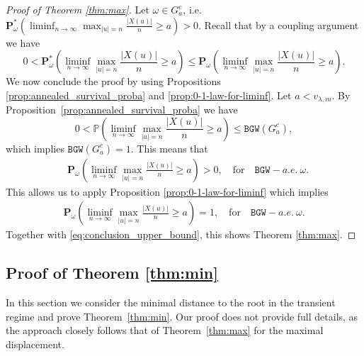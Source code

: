 \documentclass[11 pt]{article}
\theoremstyle{definition}
\numberwithin{equation}{section}
\newcommand{\PP}{\mathbb{P}} %
\newcommand{\Pw}{\mathbf{P}_{\omega}} %
\begin{document}
\begin{proof}[Proof of Theorem \ref{thm:max}]
	Let $\omega \in G_a^c$, i.e.\ $\mathbf{P}_{\omega}^* ( \liminf_{n \to \infty} \max_{|u|=n} \frac{\vert X(u) \vert }{n} \geq a )>0$. Recall that by a coupling argument we have
	  $$0<\mathbf{P}_{\omega}^* ( \liminf_{n \to \infty} \max_{|u|=n} \frac{\vert X(u) \vert }{n} \geq a )\le \mathbf{P}_{\omega} ( \liminf_{n \to \infty} \max_{|u|=n} \frac{\vert X(u) \vert }{n} \geq a ).$$
	We now conclude the proof by using Propositions \ref{prop:annealed_survival_proba} and \ref{prop:0-1-law-for-liminf}. Let $a<v_{\lambda,m}$. By Proposition~\ref{prop:annealed_survival_proba} we have 
	\begin{equation*}
		0<\PP \left( \liminf_{n\to\infty} \max_{\vert u \vert = n} \frac{\vert X(u) \vert}{n} \ge  a\right) \le \mathtt{BGW}(G_a^c),
	\end{equation*}
	which implies $\mathtt{BGW}(G_{a}^c) =1$. This means that 
	\begin{align*}
		&\Pw\left( \liminf_{n\to\infty} \max_{\vert u \vert = n} \frac{\vert X(u) \vert}{n} \geq a\right) > 0 , \quad \text{for} \quad \mathtt{BGW}-a.e. \ \omega .
	\end{align*}
	This allows us to apply Proposition \ref{prop:0-1-law-for-liminf} which implies
	\begin{align*} \Pw\left( \liminf_{n\to\infty} \max_{\vert u \vert = n} \frac{\vert X(u) \vert}{n} \geq a\right) =1, \quad \text{for} \quad \mathtt{BGW}-a.e. \ \omega.
	\end{align*}
	Together with \eqref{eq:conclusion_upper_bound}, this shows Theorem \ref{thm:max}.
\end{proof}


\subsection{Proof of Theorem \ref{thm:min}}\label{sec:min}
In this section we consider the minimal distance to the root in the transient regime and prove Theorem~\ref{thm:min}. Our proof does not provide full details, as the approach closely follows that of Theorem~\ref{thm:max} for the maximal displacement.
\end{document}
